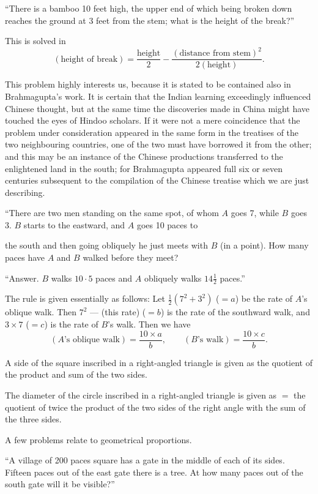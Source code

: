 \documentclass[11pt]{article}
\newcommand{\scanpage}[2]{\clearpage\setcounter{footnote}{0}\noindent{\footnotesize\color{gray}PDF page #1 · #2}\par\medskip}
\newcommand{\scanfooter}{}
\begin{document}
``There is a bamboo 10 feet high, the upper end of which being broken down reaches the ground at 3 feet from the stem; what is the height of the break?''

This is solved in
\[
(\text{height of break})=\frac{\text{height}}{2}-\frac{(\text{distance from stem})^2}{2(\text{height})}.
\]

This problem highly interests us, because it is stated to be contained also in Brahmagupta's work. It is certain that the Indian learning exceedingly influenced Chinese thought, but at the same time the discoveries made in China might have touched the eyes of Hindoo scholars. If it were not a mere coincidence that the problem under consideration appeared in the same form in the treatises of the two neighbouring countries, one of the two must have borrowed it from the other; and this may be an instance of the Chinese productions transferred to the enlightened land in the south; for Brahmagupta appeared full six or seven centuries subsequent to the compilation of the Chinese treatise which we are just describing.

``There are two men standing on the same spot, of whom $A$ goes 7, while $B$ goes 3. $B$ starts to the eastward, and $A$ goes 10 paces to
\scanfooter

\scanpage{0038}{Chapter 3, printed page 24}
the south and then going obliquely he just meets with $B$ (in a point). How many paces have $A$ and $B$ walked before they meet?

``Answer. $B$ walks $10\cdot5$ paces and $A$ obliquely walks $14\frac12$ paces.''

The rule is given essentially as follows: Let $\frac12(7^2+3^2)$ ($=a$) be the rate of $A$'s oblique walk. Then $7^2$ --- (this rate) ($=b$) is the rate of the southward walk, and $3\times7$ ($=c$) is the rate of $B$'s walk. Then we have
\[
(A\text{'s oblique walk})=\frac{10\times a}{b},\qquad (B\text{'s walk})=\frac{10\times c}{b}.
\]

A side of the square inscribed in a right-angled triangle is given as the quotient of the product and sum of the two sides.

The diameter of the circle inscribed in a right-angled triangle is given as $=$ the quotient of twice the product of the two sides of the right angle with the sum of the three sides.

A few problems relate to geometrical proportions.

``A village of 200 paces square has a gate in the middle of each of its sides. Fifteen paces out of the east gate there is a tree. At how many paces out of the south gate will it be visible?''
\end{document}
